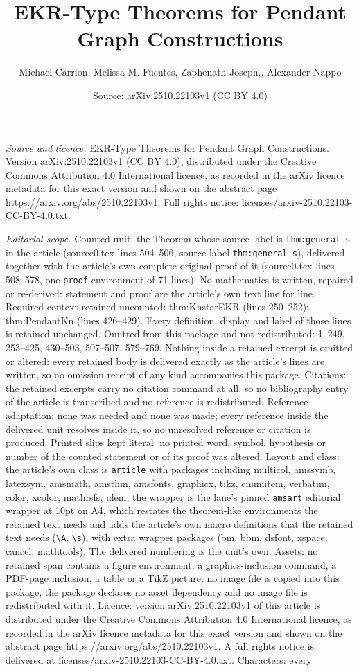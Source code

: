 \documentclass[10pt,a4paper]{amsart}
\title[EKR-Type Theorems for Pendant Graph Constructions]{EKR-Type Theorems for Pendant Graph Constructions}
\author{Michael Carrion, Melissa M. Fuentes, Zaphenath Joseph,, Alexander Nappo}
\date{Source: arXiv:2510.22103v1 (CC BY 4.0)}
\begin{document}
\maketitle

\noindent\emph{Source and licence.} EKR-Type Theorems for Pendant Graph Constructions. Version arXiv:2510.22103v1 (CC BY 4.0), distributed under the Creative Commons Attribution 4.0 International licence, as recorded in the arXiv licence metadata for this exact version and shown on the abstract page https://arxiv.org/abs/2510.22103v1. Full rights notice: licenses/arxiv-2510.22103-CC-BY-4.0.txt.\par\smallskip

\noindent\textit{Editorial scope.} Counted unit: the Theorem whose source label is \texttt{thm:general-s} in the article (source0.tex lines 504--506, source label \texttt{thm:general-s}), delivered together with the article's own complete original proof of it (source0.tex lines 508--578, one \texttt{proof} environment of 71 lines). No mathematics is written, repaired or re-derived: statement and proof are the article's own text line for line. Required context retained uncounted: thm:KnstarEKR (lines 250--252); thm:PendantKn (lines 426--429). Every definition, display and label of those lines is retained unchanged. Omitted from this package and not redistributed: 1--249, 253--425, 430--503, 507--507, 579--769. Nothing inside a retained excerpt is omitted or altered: every retained body is delivered exactly as the article's lines are written, so no omission receipt of any kind accompanies this package. Citations: the retained excerpts carry no citation command at all, so no bibliography entry of the article is transcribed and no reference is redistributed. Reference adaptation: none was needed and none was made; every reference inside the delivered unit resolves inside it, so no unresolved reference or citation is produced. Printed slips kept literal: no printed word, symbol, hypothesis or number of the counted statement or of its proof was altered. Layout and class: the article's own class is \texttt{article} with packages including multicol, amssymb, latexsym, amsmath, amsthm, amsfonts, graphicx, tikz, enumitem, verbatim, color, xcolor, mathrsfs, ulem; the wrapper is the lane's pinned \texttt{amsart} editorial wrapper at 10pt on A4, which restates the theorem-like environments the retained text needs and adds the article's own macro definitions that the retained text needs (\texttt{\textbackslash A}, \texttt{\textbackslash s}), with extra wrapper packages (bm, bbm, dsfont, xspace, cancel, mathtools). The delivered numbering is the unit's own. Assets: no retained span contains a figure environment, a graphics-inclusion command, a PDF-page inclusion, a table or a TikZ picture; no image file is copied into this package, the package declares no asset dependency and no image file is redistributed with it. Licence: version arXiv:2510.22103v1 of this article is distributed under the Creative Commons Attribution 4.0 International licence, as recorded in the arXiv licence metadata for this exact version and shown on the abstract page https://arxiv.org/abs/2510.22103v1. A full rights notice is delivered at licenses/arxiv-2510.22103-CC-BY-4.0.txt. Characters: every 
\end{document}
